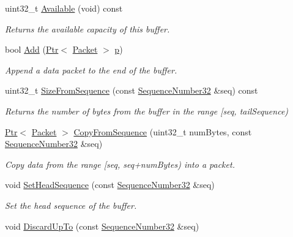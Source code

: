 \begin{DoxyCompactItemize}
uint32\+\_\+t \hyperlink{classns3_1_1TcpTxBuffer_a6063c2b280533f8e640296e6d0204ba2}{Available} (void) const 
\begin{DoxyCompactList}\small\item\em Returns the available capacity of this buffer. \end{DoxyCompactList}\item 
bool \hyperlink{classns3_1_1TcpTxBuffer_a275d96f2c58333c9e7c5fe0f1fa152e1}{Add} (\hyperlink{classns3_1_1Ptr}{Ptr}$<$ \hyperlink{classns3_1_1Packet}{Packet} $>$ \hyperlink{lte__link__budget__x2__handover__measures_8m_ac9de518908a968428863f829398a4e62}{p})
\begin{DoxyCompactList}\small\item\em Append a data packet to the end of the buffer. \end{DoxyCompactList}\item 
uint32\+\_\+t \hyperlink{classns3_1_1TcpTxBuffer_a6e44c34fdb2c14dcc11dbbe86d8b328a}{Size\+From\+Sequence} (const \hyperlink{group__network_gacb2070e4e98d2d5135c9bede58f07a03}{Sequence\+Number32} \&seq) const 
\begin{DoxyCompactList}\small\item\em Returns the number of bytes from the buffer in the range \mbox{[}seq, tail\+Sequence) \end{DoxyCompactList}\item 
\hyperlink{classns3_1_1Ptr}{Ptr}$<$ \hyperlink{classns3_1_1Packet}{Packet} $>$ \hyperlink{classns3_1_1TcpTxBuffer_a5eb9c889cfad2cd11a5ccf996c506fd3}{Copy\+From\+Sequence} (uint32\+\_\+t num\+Bytes, const \hyperlink{group__network_gacb2070e4e98d2d5135c9bede58f07a03}{Sequence\+Number32} \&seq)
\begin{DoxyCompactList}\small\item\em Copy data from the range \mbox{[}seq, seq+num\+Bytes) into a packet. \end{DoxyCompactList}\item 
void \hyperlink{classns3_1_1TcpTxBuffer_ae9d25292f14d338abe26a2657e103921}{Set\+Head\+Sequence} (const \hyperlink{group__network_gacb2070e4e98d2d5135c9bede58f07a03}{Sequence\+Number32} \&seq)
\begin{DoxyCompactList}\small\item\em Set the head sequence of the buffer. \end{DoxyCompactList}\item 
void \hyperlink{classns3_1_1TcpTxBuffer_ad145a6de0122b3400fcbbff030d2acea}{Discard\+Up\+To} (const \hyperlink{group__network_gacb2070e4e98d2d5135c9bede58f07a03}{Sequence\+Number32} \&seq)

\end{DoxyCompactItemize}
